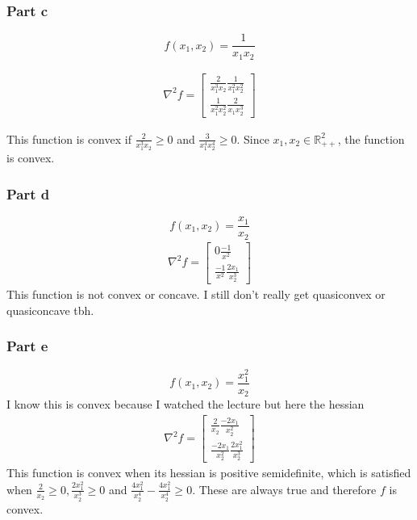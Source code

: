 \subsubsection{Part c}
\begin{equation}
  f(x_1, x_2) = \frac{1}{x_1 x_2}
\end{equation}

\begin{align}
  \nabla^2 f =
  \begin{bmatrix}
     \frac{2}{x_1^3 x_2} \frac{1}{x_1^2 x_2^2} \\
     \frac{1}{x_1^2 x_2^2} \frac{2}{x_1 x_2^3}
  \end{bmatrix}
\end{align}

This function is convex if $\frac{2}{x_1^3 x_2} \geq 0$ and $\frac{3}{x_1^4 x_2^4} \geq 0$. Since $x_1,x_2 \in \mathbb{R}_{++}^2$, the function is convex.

\subsubsection{Part d}
\begin{equation}
  f(x_1, x_2) = \frac{x_1}{x_2}
\end{equation}
\begin{align}
  \nabla^2 f =
  \begin{bmatrix}
     0 \frac{-1}{x^2} \\
     \frac{-1}{x^2} \frac{2x_1}{x_2^3}
  \end{bmatrix}
\end{align}
This function is not convex or concave. I still don't really get quasiconvex or quasiconcave tbh.

\subsubsection{Part e}
\begin{equation}
  f(x_1, x_2) = \frac{x_1^2}{x_2}
\end{equation}
I know this is convex because I watched the lecture but here the hessian
\begin{align}
  \nabla^2 f = 
  \begin{bmatrix}
     \frac{2}{x_2} \frac{-2x_1}{x_2^2} \\
     \frac{-2x_1}{x_2^2} \frac{2x_1^2}{x_2^3}
  \end{bmatrix}
\end{align}
This function is convex when its hessian is positive semidefinite, which is satisfied when $\frac{2}{x_2} \geq 0, \frac{2x_1^2}{x_2^3} \geq 0$ and $\frac{4x_1^2}{x_2^4}   - \frac{4x_1^2}{x_2^4}  \geq 0$. These are always true and therefore $f$ is convex.

